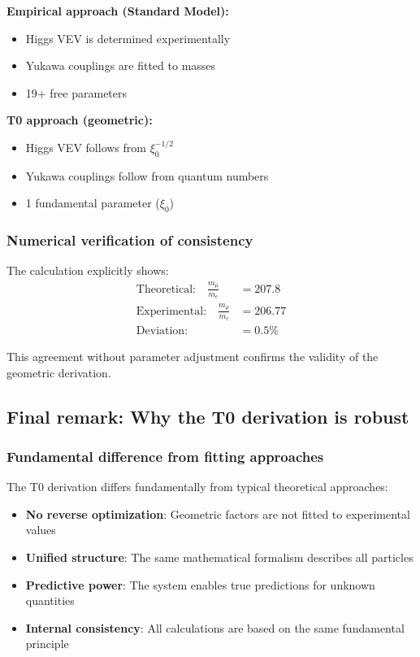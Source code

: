 \documentclass[12pt,a4paper]{article}
\begin{document}
\textbf{Empirical approach (Standard Model):}
\begin{itemize}
	\item Higgs VEV is determined experimentally
	\item Yukawa couplings are fitted to masses
	\item 19+ free parameters
\end{itemize}

\textbf{T0 approach (geometric):}
\begin{itemize}
	\item Higgs VEV follows from $\xi_0^{-1/2}$
	\item Yukawa couplings follow from quantum numbers
	\item 1 fundamental parameter ($\xi_0$)
\end{itemize}

\subsubsection{Numerical verification of consistency}

The calculation explicitly shows:
\begin{align}
	\text{Theoretical:} \quad \frac{m_\mu}{m_e} &= 207.8\\
	\text{Experimental:} \quad \frac{m_\mu}{m_e} &= 206.77\\
	\text{Deviation:} \quad &= 0.5\%
\end{align}

This agreement without parameter adjustment confirms the validity of the geometric derivation.

\subsection{Final remark: Why the T0 derivation is robust}

\subsubsection{Fundamental difference from fitting approaches}

The T0 derivation differs fundamentally from typical theoretical approaches:

\begin{itemize}
	\item \textbf{No reverse optimization}: Geometric factors are not fitted to experimental values
	\item \textbf{Unified structure}: The same mathematical formalism describes all particles
	\item \textbf{Predictive power}: The system enables true predictions for unknown quantities
	\item \textbf{Internal consistency}: All calculations are based on the same fundamental principle
\end{itemize}
\end{document}
